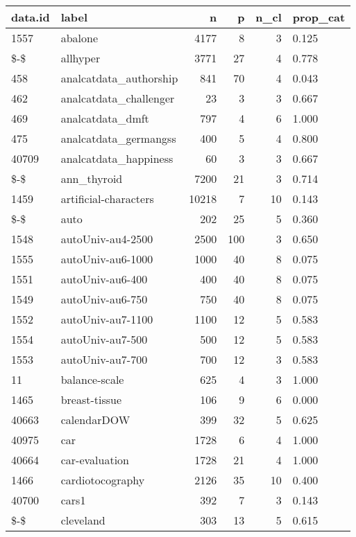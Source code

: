 \begin{table}[ht]
\centering
\begin{tabular}{llrrrl}
  \hline
data.id & label & n & p & n\_cl & prop\_cat \\ 
  \hline
1557 & abalone & 4177 & 8 & 3 & 0.125 \\ 
  \$-\$ & allhyper & 3771 & 27 & 4 & 0.778 \\ 
  458 & analcatdata\_authorship & 841 & 70 & 4 & 0.043 \\ 
  462 & analcatdata\_challenger & 23 & 3 & 3 & 0.667 \\ 
  469 & analcatdata\_dmft & 797 & 4 & 6 & 1.000 \\ 
  475 & analcatdata\_germangss & 400 & 5 & 4 & 0.800 \\ 
  40709 & analcatdata\_happiness & 60 & 3 & 3 & 0.667 \\ 
  \$-\$ & ann\_thyroid & 7200 & 21 & 3 & 0.714 \\ 
  1459 & artificial-characters & 10218 & 7 & 10 & 0.143 \\ 
  \$-\$ & auto & 202 & 25 & 5 & 0.360 \\ 
  1548 & autoUniv-au4-2500 & 2500 & 100 & 3 & 0.650 \\ 
  1555 & autoUniv-au6-1000 & 1000 & 40 & 8 & 0.075 \\ 
  1551 & autoUniv-au6-400 & 400 & 40 & 8 & 0.075 \\ 
  1549 & autoUniv-au6-750 & 750 & 40 & 8 & 0.075 \\ 
  1552 & autoUniv-au7-1100 & 1100 & 12 & 5 & 0.583 \\ 
  1554 & autoUniv-au7-500 & 500 & 12 & 5 & 0.583 \\ 
  1553 & autoUniv-au7-700 & 700 & 12 & 3 & 0.583 \\ 
  11 & balance-scale & 625 & 4 & 3 & 1.000 \\ 
  1465 & breast-tissue & 106 & 9 & 6 & 0.000 \\ 
  40663 & calendarDOW & 399 & 32 & 5 & 0.625 \\ 
  40975 & car & 1728 & 6 & 4 & 1.000 \\ 
  40664 & car-evaluation & 1728 & 21 & 4 & 1.000 \\ 
  1466 & cardiotocography & 2126 & 35 & 10 & 0.400 \\ 
  40700 & cars1 & 392 & 7 & 3 & 0.143 \\ 
  \$-\$ & cleveland & 303 & 13 & 5 & 0.615 \\ 

\end{tabular}
\end{table}
